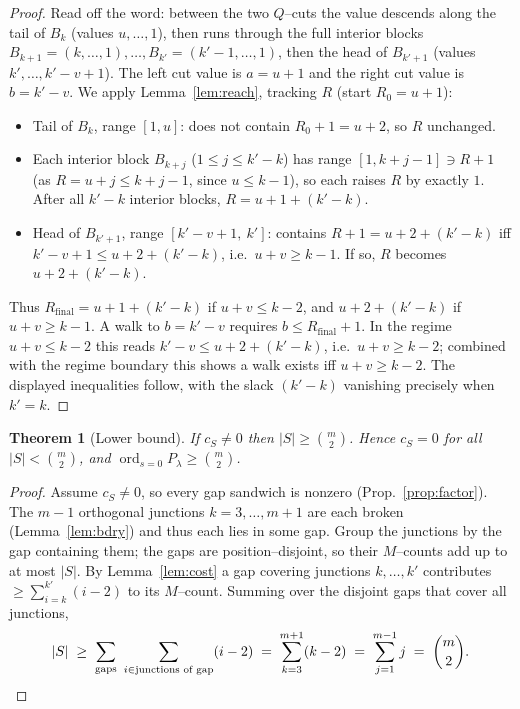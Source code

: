 \documentclass[11pt]{article}
\newtheorem{theorem}{Theorem}
\theoremstyle{definition}
\DeclareMathOperator{\ord}{ord}
\newcommand{\la}{\lambda}
\begin{document}
\begin{proof}
Read off the word: between the two $Q$--cuts the value descends along the tail of $B_k$
(values $u,\dots,1$), then runs through the full interior blocks
$B_{k+1}=(k,\dots,1),\dots,B_{k'}=(k'-1,\dots,1)$, then the head of $B_{k'+1}$ (values
$k',\dots,k'{-}v{+}1$). The left cut value is $a=u+1$ and the right cut value is
$b=k'-v$. We apply Lemma~\ref{lem:reach}, tracking $R$ (start $R_0=u+1$):
\begin{itemize}
\item Tail of $B_k$, range $[1,u]$: does not contain $R_0+1=u+2$, so $R$ unchanged.
\item Each interior block $B_{k+j}$ ($1\le j\le k'-k$) has range $[1,k+j-1]\ni R+1$
(as $R=u+j\le k+j-1$, since $u\le k-1$), so each raises $R$ by exactly $1$. After all
$k'-k$ interior blocks, $R=u+1+(k'-k)$.
\item Head of $B_{k'+1}$, range $[k'-v+1,\ k']$: contains $R+1=u+2+(k'-k)$ iff
$k'-v+1\le u+2+(k'-k)$, i.e.\ $u+v\ge k-1$. If so, $R$ becomes $u+2+(k'-k)$.
\end{itemize}
Thus $R_{\mathrm{final}}=u+1+(k'-k)$ if $u+v\le k-2$, and $u+2+(k'-k)$ if $u+v\ge k-1$.
A walk to $b=k'-v$ requires $b\le R_{\mathrm{final}}+1$. In the regime $u+v\le k-2$ this
reads $k'-v\le u+2+(k'-k)$, i.e.\ $u+v\ge k-2$; combined with the regime boundary this
shows a walk exists iff $u+v\ge k-2$. The displayed inequalities follow, with the slack
$(k'-k)$ vanishing precisely when $k'=k$.
\end{proof}

\begin{theorem}[Lower bound]\label{thm:lb}
If $c_S\ne0$ then $|S|\ge\binom m2$. Hence $c_S=0$ for all $|S|<\binom m2$, and
$\ord_{s=0}P_\la\ge\binom m2$.
\end{theorem}

\begin{proof}
Assume $c_S\ne0$, so every gap sandwich is nonzero (Prop.~\ref{prop:factor}). The
$m-1$ orthogonal junctions $k=3,\dots,m+1$ are each broken (Lemma~\ref{lem:bdry}) and
thus each lies in some gap. Group the junctions by the gap containing them; the gaps
are position--disjoint, so their $M$--counts add up to at most $|S|$. By
Lemma~\ref{lem:cost} a gap covering junctions $k,\dots,k'$ contributes
$\ge\sum_{i=k}^{k'}(i-2)$ to its $M$--count. Summing over the disjoint gaps that cover
all junctions,
\[
|S|\;\ge\;\sum_{\text{gaps}}\ \sum_{i\in\text{junctions of gap}}(i-2)
\;=\;\sum_{k=3}^{m+1}(k-2)\;=\;\sum_{j=1}^{m-1}j\;=\;\binom m2 . \qedhere
\]
\end{proof}
\end{document}
